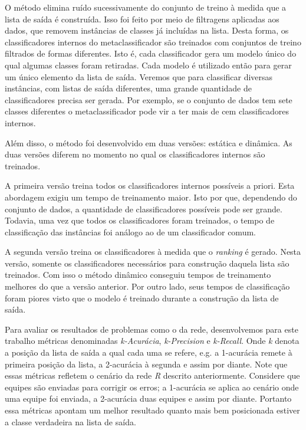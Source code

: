 O método elimina ruído sucessivamente do conjunto de treino à medida que a lista de saída é construída.
Isso foi feito por meio de filtragens aplicadas aos dados, que removem instâncias de classes já incluídas na lista.
Desta forma, os classificadores internos do metaclassificador são treinados com conjuntos de treino filtrados de formas diferentes.
Isto é, cada classificador gera um modelo único do qual algumas classes foram retiradas.
Cada modelo é utilizado então para gerar um único elemento da lista de saída.
Veremos que para classificar diversas instâncias, com listas de saída diferentes, uma grande quantidade de classificadores precisa ser gerada.
Por exemplo, se o conjunto de dados tem sete classes diferentes o metaclassificador pode vir a ter mais de cem classificadores internos.

Além disso, o método foi desenvolvido em duas versões: estática e dinâmica.
As duas versões diferem no momento no qual os classificadores internos são treinados.

A primeira versão treina todos os classificadores internos possíveis a priori.
Esta abordagem exigiu um tempo de treinamento maior.
Isto por que, dependendo do conjunto de dados, a quantidade de classificadores possíveis pode ser grande.
Todavia, uma vez que todos os classificadores foram treinados, o tempo de classificação das instâncias foi análogo ao de um classificador comum.

A segunda versão treina os classificadores à medida que o \textit{ranking} é gerado.
Nesta versão, somente os classificadores necessários para construção daquela lista são treinados.
Com isso o método dinâmico conseguiu tempos de treinamento melhores do que a versão anterior.
Por outro lado, seus tempos de classificação foram piores visto que o modelo é treinado durante a construção da lista de saída.

Para avaliar os resultados de problemas como o da rede, desenvolvemos para este trabalho métricas denominadas \textit{k-Acurácia}, \textit{k-Precision} e \textit{k-Recall}.
Onde \textit{k} denota a posição da lista de saída a qual cada uma se refere, e.g. a 1-acurácia remete à primeira posição da lista, a 2-acurácia à segunda e assim por diante.
Note que essas métricas refletem o cenário da rede \textit{R} descrito anteriormente.
Considere que equipes são enviadas para corrigir os erros; a 1-acurácia se aplica ao cenário onde uma equipe foi enviada, a 2-acurácia duas equipes e assim por diante.
Portanto essa métricas apontam um melhor resultado quanto mais bem posicionada estiver a classe verdadeira na lista de saída.

